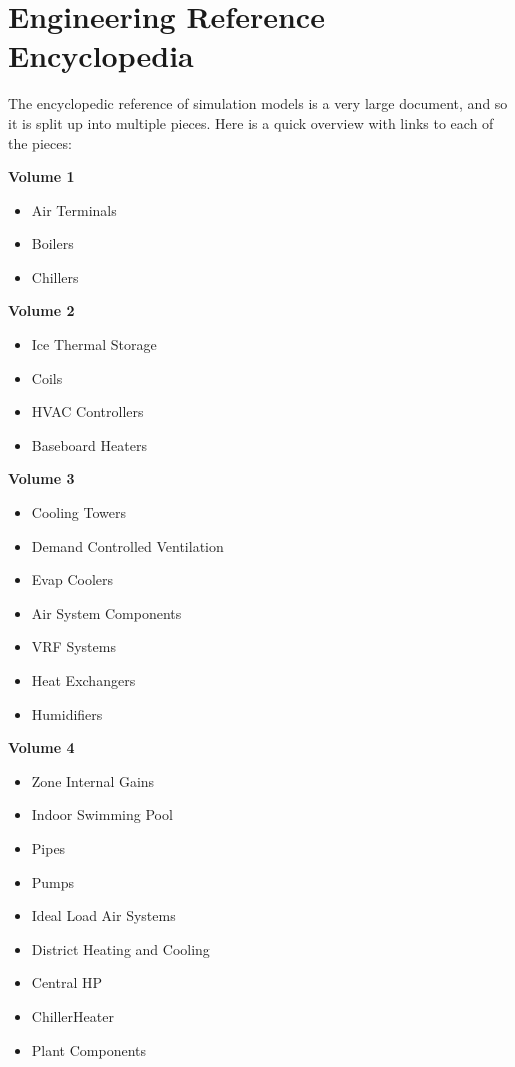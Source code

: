 \chapter{Engineering Reference Encyclopedia}\label{engineering-reference-encyclopedia}

The encyclopedic reference of simulation models is a very large document, and so it is split up into multiple pieces. Here is a quick overview with links to each of the pieces:

\textbf{Volume 1}

\begin{itemize}
  \item Air Terminals
  \item Boilers
  \item Chillers
\end{itemize}

\textbf{Volume 2}

\begin{itemize}
  \item Ice Thermal Storage
  \item Coils
  \item HVAC Controllers
  \item Baseboard Heaters
\end{itemize}

\textbf{Volume 3}

\begin{itemize}
  \item Cooling Towers
  \item Demand Controlled Ventilation
  \item Evap Coolers
  \item Air System Components
  \item VRF Systems
  \item Heat Exchangers
  \item Humidifiers
\end{itemize}

\textbf{Volume 4}

\begin{itemize}
  \item Zone Internal Gains
  \item Indoor Swimming Pool
  \item Pipes
  \item Pumps
  \item Ideal Load Air Systems
  \item District Heating and Cooling
  \item Central HP
  \item ChillerHeater
  \item Plant Components
\end{itemize}


